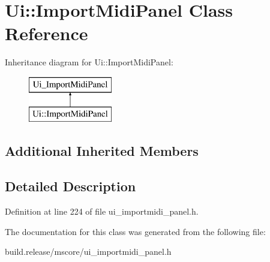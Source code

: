 \hypertarget{class_ui_1_1_import_midi_panel}{}\section{Ui\+:\+:Import\+Midi\+Panel Class Reference}
\label{class_ui_1_1_import_midi_panel}
Inheritance diagram for Ui\+:\+:Import\+Midi\+Panel\+:\begin{figure}[H]
\begin{center}
\leavevmode
\includegraphics[height=2.000000cm]{class_ui_1_1_import_midi_panel}
\end{center}
\end{figure}
\subsection*{Additional Inherited Members}


\subsection{Detailed Description}


Definition at line 224 of file ui\+\_\+importmidi\+\_\+panel.\+h.



The documentation for this class was generated from the following file\+:\begin{DoxyCompactItemize}
\item 
build.\+release/mscore/ui\+\_\+importmidi\+\_\+panel.\+h\end{DoxyCompactItemize}
